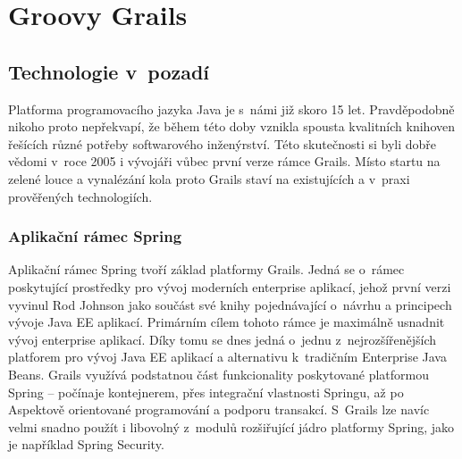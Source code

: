 \chapter{Groovy Grails}

\section{Technologie v~pozadí}
Platforma programovacího jazyka Java je s~námi  již skoro 15 let. Pravděpodobně nikoho proto nepřekvapí, že během této doby vznikla spousta kvalitních knihoven řešících různé potřeby softwarového inženýrství. Této skutečnosti si byli dobře vědomi v~roce 2005 i vývojáři vůbec první verze rámce Grails. Místo startu na zelené louce a vynalézání kola proto Grails staví na existujících a v~praxi prověřených technologiích\cite{grails-in-action}.

\subsection{Aplikační rámec Spring}
Aplikační rámec Spring tvoří základ platformy Grails. Jedná se o~rámec poskytující prostředky pro vývoj moderních enterprise aplikací, jehož první verzi vyvinul Rod Johnson jako součást své knihy  pojednávající o~návrhu a principech vývoje Java EE aplikací. Primárním cílem tohoto rámce je maximálně usnadnit vývoj enterprise aplikací. Díky tomu se dnes jedná o~jednu z~nejrozšířenějších platforem pro vývoj Java EE aplikací a alternativu k~tradičním Enterprise Java Beans\cite{spring-homepage}. Grails využívá podstatnou část funkcionality poskytované platformou Spring -- počínaje  kontejnerem, přes integrační vlastnosti Springu, až po Aspektově orientované programování a podporu transakcí. S~Grails lze navíc velmi snadno použít i libovolný z~modulů rozšiřující jádro platformy Spring, jako je například Spring Security.


